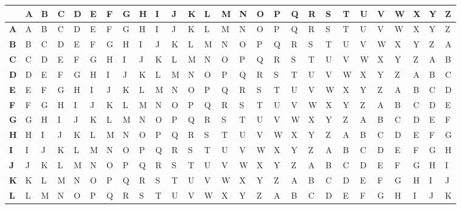 \documentclass[a4paper]{article}
\theoremstyle{defn}
\theoremstyle{theorem}
\theoremstyle{lemma}
\theoremstyle{cor}
\theoremstyle{fact}
\begin{document}
\begin{center}
\begin{longtable}
{|p{1.5mm}|p{1.5mm}|p{1.5mm}|p{1.5mm}|p{1.5mm}|p{1.5mm}|p{1.5mm}|p{1.5mm}|p{1.5mm}|p{1.5mm}|p{1.5mm}|p{1.5mm}|p{1.5mm}|p{1.5mm}|p{1.5mm}|p{1.5mm}|p{1.5mm}|p{1.5mm}|p{1.5mm}|p{1.5mm}|p{1.5mm}|p{1.5mm}|p{1.5mm}|p{1.5mm}|p{1.5mm}|p{1.5mm}|p{1.5mm}|}
\hline
 & \textbf{A} & \textbf{B} & \textbf{C} & \textbf{D} & \textbf{E} & \textbf{F} & \textbf{G} & \textbf{H} & \textbf{I} & \textbf{J} & \textbf{K} & \textbf{L} & \textbf{M} & \textbf{N} & \textbf{O} & \textbf{P} & \textbf{Q} & \textbf{R} & \textbf{S} & \textbf{T} & \textbf{U} & \textbf{V} &
\textbf{W} & \textbf{X} & \textbf{Y} & \textbf{Z} \\
\hline
\textbf{A} & A & B & C & D & E & F & G & H & I & J & K & L & M & N & O & P & Q & R & S & T & U & V &
W & X & Y & Z
\\
\hline
\textbf{B} & B & C & D & E & F & G & H & I & J & K & L & M & N & O & P & Q & R & S & T & U & V & W & X
 & Y & Z & A
\\
\hline
\textbf{C} & C & D & E & F & G & H & I & J & K & L & M & N & O & P & Q & R & S & T & U & V & W & X & Y
 & Z & A & B
\\
\hline
\textbf{D} & D & E & F & G & H & I & J & K & L & M & N & O & P & Q & R & S & T & U & V & W & X & Y & Z
 & A & B & C
\\
\hline
\textbf{E} & E & F & G & H & I & J & K & L & M & N & O & P & Q & R & S & T & U & V & W & X & Y & Z & A
 & B & C & D
\\
\hline
\textbf{F} & F & G & H & I & J & K & L & M & N & O & P & Q & R & S & T & U & V & W & X & Y & Z & A & B
 & C & D & E
\\
\hline
\textbf{G} & G & H & I & J & K & L & M & N & O & P & Q & R & S & T & U & V & W & X & Y & Z & A & B & C
 & D & E & F
\\
\hline
\textbf{H} & H & I & J & K & L & M & N & O & P & Q & R & S & T & U & V & W & X & Y & Z & A & B & C & D
 & E & F & G
\\
\hline
\textbf{I} & I & J & K & L & M & N & O & P & Q & R & S & T & U & V & W & X & Y & Z & A & B & C & D & E
 & F & G & H
\\
\hline
\textbf{J} & J & K & L & M & N & O & P & Q & R & S & T & U & V & W & X & Y & Z & A & B & C & D & E & F & G & H & I
\\
\hline
\textbf{K} & K & L & M & N & O & P & Q & R & S & T & U & V & W & X & Y & Z & A & B & C & D & E & F & G & H & I & J
\\
\hline
\textbf{L} & L & M & N & O & P & Q & R & S & T & U & V & W & X & Y & Z & A & B & C & D & E & F & G & H & I & J & K

\end{longtable}
\end{center}
\end{document}
